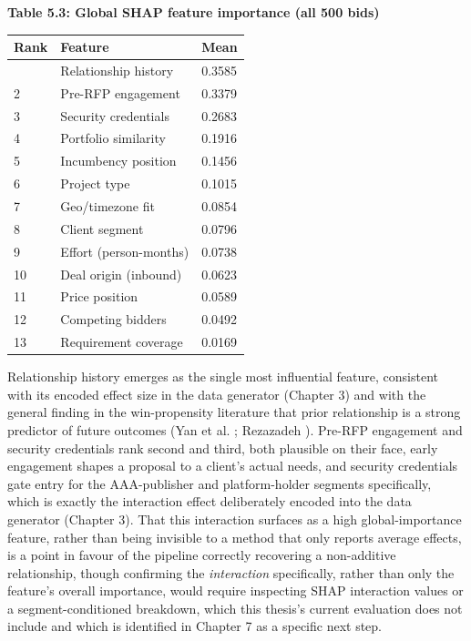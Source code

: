 \textbf{Table 5.3: Global SHAP feature importance (all 500 bids)}

\begin{longtable}[]{@{}lll@{}}
\toprule\noalign{}
Rank & Feature & Mean \\
\midrule\noalign{}
\endhead
\bottomrule\noalign{}
\endlastfoot
1 & Relationship history & 0.3585 \\
2 & Pre-RFP engagement & 0.3379 \\
3 & Security credentials & 0.2683 \\
4 & Portfolio similarity & 0.1916 \\
5 & Incumbency position & 0.1456 \\
6 & Project type & 0.1015 \\
7 & Geo/timezone fit & 0.0854 \\
8 & Client segment & 0.0796 \\
9 & Effort (person-months) & 0.0738 \\
10 & Deal origin (inbound) & 0.0623 \\
11 & Price position & 0.0589 \\
12 & Competing bidders & 0.0492 \\
13 & Requirement coverage & 0.0169 \\
\end{longtable}

Relationship history emerges as the single most influential feature,
consistent with its encoded effect size in the data generator (Chapter
3) and with the general finding in the win-propensity literature that
prior relationship is a strong predictor of future outcomes (Yan et al.
\citeyearpar{yan2015sales}; Rezazadeh
\citeyearpar{rezazadeh2020generalized}). Pre-RFP engagement and security
credentials rank second and third, both plausible on their face, early
engagement shapes a proposal to a client's actual needs, and security
credentials gate entry for the AAA-publisher and platform-holder
segments specifically, which is exactly the interaction effect
deliberately encoded into the data generator (Chapter 3). That this
interaction surfaces as a high global-importance feature, rather than
being invisible to a method that only reports average effects, is a
point in favour of the pipeline correctly recovering a non-additive
relationship, though confirming the \emph{interaction} specifically,
rather than only the feature's overall importance, would require
inspecting SHAP interaction values or a segment-conditioned breakdown,
which this thesis's current evaluation does not include and which is
identified in Chapter 7 as a specific next step.

